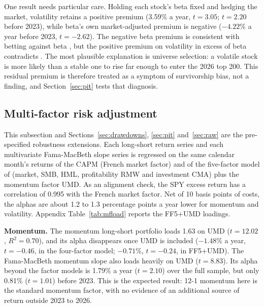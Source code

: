 \documentclass[11pt,a4paper]{article}
\begin{document}
One result needs particular care. Holding each stock's beta fixed and hedging the market, volatility retains a positive premium (3.59\% a year, $t = 3.05$; $t = 2.20$ before 2023), while beta's own market-adjusted premium is negative ($-4.22\%$ a year before 2023, $t = -2.62$). The negative beta premium is consistent with betting against beta \citep{frazzini2014}, but the positive premium on volatility in excess of beta contradicts \citet{ang2006}. The most plausible explanation is universe selection: a volatile stock is more likely than a stable one to rise far enough to enter the 2026 top 200. This residual premium is therefore treated as a symptom of survivorship bias, not a finding, and Section~\ref{sec:pit} tests that diagnosis.

\subsection{Multi-factor risk adjustment}
\label{sec:multifactor}

This subsection and Sections~\ref{sec:drawdowns}, \ref{sec:pit} and~\ref{sec:raw} are the pre-specified robustness extensions. Each long-short return series and each multivariate Fama-MacBeth slope series is regressed on the same calendar month's returns of the CAPM (French market factor) and of the five-factor model of \citet{fama2015} (market, SMB, HML, profitability RMW and investment CMA) plus the momentum factor UMD. As an alignment check, the SPY excess return has a correlation of 0.995 with the French market factor. Net of 10 basis points of costs, the alphas are about 1.2 to 1.3 percentage points a year lower for momentum and volatility. Appendix Table~\ref{tab:mfload} reports the FF5+UMD loadings.

\begin{table}[!htbp]
\centering
\caption{Annualised alphas against the CAPM and the Fama-French five-factor model plus momentum (FF5+UMD), with Newey-West $t$-statistics in parentheses. French factor data run to August 2026, so every regression uses the full return sample.}
\label{tab:mf}
\small

\end{table}

\textbf{Momentum.} The momentum long-short portfolio loads 1.63 on UMD ($t = 12.02$, $R^2 = 0.70$), and its alpha disappears once UMD is included ($-1.48\%$ a year, $t = -0.46$, in the \citet{carhart1997} four-factor model; $-0.71\%$, $t = -0.24$, in FF5+UMD). The Fama-MacBeth momentum slope also loads heavily on UMD ($t = 8.83$). Its alpha beyond the factor models is 1.79\% a year ($t = 2.10$) over the full sample, but only 0.81\% ($t = 1.01$) before 2023. This is the expected result: 12-1 momentum here is the standard momentum factor, with no evidence of an additional source of return outside 2023 to 2026.
\end{document}
